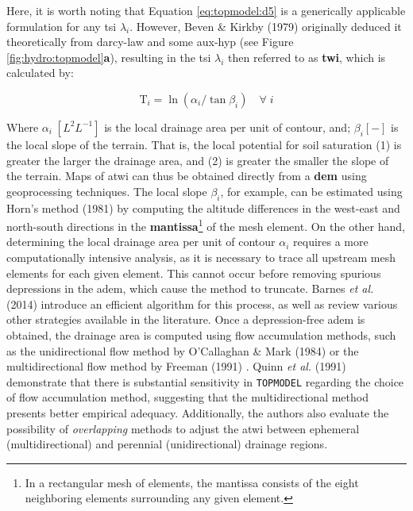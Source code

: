 \documentclass[./main_en.tex]{subfiles}
\begin{document}
\par Here, it is worth noting that Equation \eqref{eq:topmodel:d5} is a generically applicable formulation for any \gls{tsi} $\lambda_{i}$. However, Beven \& Kirkby (1979) originally deduced it theoretically from \gls{darcy-law} and some \gls{aux-hyp} (see Figure \ref{fig:hydro:topmodel}\textbf{a}), resulting in the \gls{tsi} $\lambda_{i}$ then referred to as \textbf{\gls{twi}}, which is calculated by:
\begin{linenomath*}
\begin{equation}
\label{eq:topmodel:twi}
\text{T}_{i}  = \ln{(\alpha_{i}/\tan \beta_{i})} \quad \forall \; i
\end{equation}
\end{linenomath*}
Where $\alpha_{i}\; [L^{2}L^{-1}]$ is the local drainage area per unit of contour, and; $\beta_{i} [-]$ is the local slope of the terrain. That is, the local potential for soil saturation (1) is greater the larger the drainage area, and (2) is greater the smaller the slope of the terrain. Maps of \acrshort{atwi} can thus be obtained directly from a \textbf{\gls{dem}} using geoprocessing techniques. The local slope $\beta_{i}$, for example, can be estimated using Horn's method (1981) \cite{Horn1981a} by computing the altitude differences in the west-east and north-south directions in the \textbf{mantissa}\footnote{In a rectangular mesh of elements, the mantissa consists of the eight neighboring elements surrounding any given element.} of the mesh element. On the other hand, determining the local drainage area per unit of contour $\alpha_{i}$ requires a more computationally intensive analysis, as it is necessary to trace all upstream mesh elements for each given element. This cannot occur before removing spurious depressions in the \acrshort{adem}, which cause the method to truncate. Barnes \textit{et al.} (2014) \cite{Barnes2014a} introduce an efficient algorithm for this process, as well as review various other strategies available in the literature. Once a depression-free \acrshort{adem} is obtained, the drainage area is computed using flow accumulation methods, such as the unidirectional flow method by O'Callaghan \& Mark (1984) \cite{Ocallaghan1984a} or the multidirectional flow method by Freeman (1991) \cite{Freeman1991a}. Quinn \textit{et al.} (1991) \cite{Quinn1991b} demonstrate that there is substantial sensitivity in \texttt{TOPMODEL} regarding the choice of flow accumulation method, suggesting that the multidirectional method presents better empirical adequacy. Additionally, the authors also evaluate the possibility of \textit{overlapping} methods to adjust the \acrshort{atwi} between ephemeral (multidirectional) and perennial (unidirectional) drainage regions.
\end{document}
